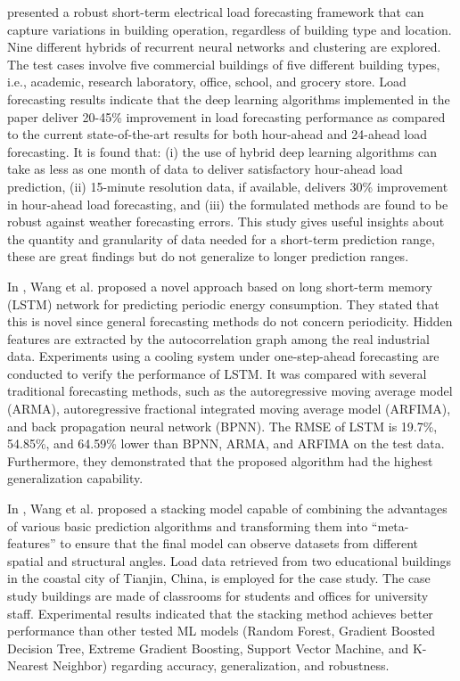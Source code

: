 \cite{CHITALIA2020115410} presented a robust short-term electrical load forecasting framework that can capture variations in building operation, regardless of building type and location.
Nine different hybrids of recurrent neural networks and clustering are explored.
The test cases involve five commercial buildings of five different building types, i.e., academic, research laboratory, office, school, and grocery store.
Load forecasting results indicate that the deep learning algorithms implemented in the paper deliver 20-45\% improvement in load forecasting performance as compared to the current state-of-the-art results for both hour-ahead and 24-ahead load forecasting.
It is found that:
(i) the use of hybrid deep learning algorithms can take as less as one month of data to deliver satisfactory hour-ahead load prediction,
(ii) 15-minute resolution data, if available, delivers 30\% improvement in hour-ahead load forecasting,
and (iii) the formulated methods are found to be robust against weather forecasting errors.
This study gives useful insights about the quantity and granularity of data needed for a short-term prediction range, these are great findings but do not generalize to longer prediction ranges.

In \cite{WANG2020117197}, Wang et al. proposed a novel approach based on long short-term memory (LSTM) network for predicting periodic energy consumption.
They stated that this is novel since general forecasting methods do not concern periodicity.
Hidden features are extracted by the autocorrelation graph among the real industrial data.
Experiments using a cooling system under one-step-ahead forecasting are conducted to verify the performance of LSTM.
It was compared with several traditional forecasting methods, such as the autoregressive moving average model (ARMA), autoregressive fractional integrated moving average model (ARFIMA), and back propagation neural network (BPNN).
The RMSE of LSTM is 19.7\%, 54.85\%, and 64.59\% lower than BPNN, ARMA, and ARFIMA on the test data.
Furthermore, they demonstrated that the proposed algorithm had the highest generalization capability.

In \cite{WANG2020114561}, Wang et al. proposed a stacking model capable of combining the advantages of various basic prediction algorithms and transforming them into “meta-features” to ensure that the final model can observe datasets from different spatial and structural angles.
Load data retrieved from two educational buildings in the coastal city of Tianjin, China, is employed for the case study.
The case study buildings are made of classrooms for students and offices for university staff.
Experimental results indicated that the stacking method achieves better performance than other tested ML models (Random Forest, Gradient Boosted Decision Tree, Extreme Gradient Boosting, Support Vector Machine, and K-Nearest Neighbor) regarding accuracy, generalization, and robustness.

